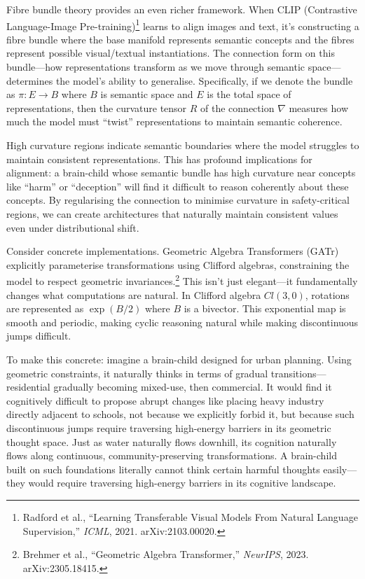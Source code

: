 \documentclass[acmsmall,screen]{acmart}
\begin{document}
Fibre bundle theory provides an even richer framework. When CLIP (Contrastive Language-Image Pre-training)\footnote{Radford et al., ``Learning Transferable Visual Models From Natural Language Supervision,'' \textit{ICML}, 2021. arXiv:2103.00020.} learns to align images and text, it's constructing a fibre bundle where the base manifold represents semantic concepts and the fibres represent possible visual/textual instantiations. The connection form on this bundle---how representations transform as we move through semantic space---determines the model's ability to generalise. Specifically, if we denote the bundle as $\pi: E \rightarrow B$ where $B$ is semantic space and $E$ is the total space of representations, then the curvature tensor $R$ of the connection $\nabla$ measures how much the model must ``twist'' representations to maintain semantic coherence.

High curvature regions indicate semantic boundaries where the model struggles to maintain consistent representations.
This has profound implications for alignment: a brain-child whose semantic bundle has high curvature near concepts like ``harm'' or ``deception'' will find it difficult to reason coherently about these concepts.
By regularising the connection to minimise curvature in safety-critical regions, we can create architectures that naturally maintain consistent values even under distributional shift.

Consider concrete implementations. Geometric Algebra Transformers (GATr) explicitly parameterise transformations using Clifford algebras, constraining the model to respect geometric invariances.\footnote{Brehmer et al., ``Geometric Algebra Transformer,'' \textit{NeurIPS}, 2023. arXiv:2305.18415.} This isn't just elegant---it fundamentally changes what computations are natural. In Clifford algebra $Cl(3,0)$, rotations are represented as $\exp(B/2)$ where $B$ is a bivector. This exponential map is smooth and periodic, making cyclic reasoning natural while making discontinuous jumps difficult. 

To make this concrete: imagine a brain-child designed for urban planning.
Using geometric constraints, it naturally thinks in terms of gradual transitions---residential gradually becoming mixed-use, then commercial.
It would find it cognitively difficult to propose abrupt changes like placing heavy industry directly adjacent to schools, not because we explicitly forbid it, but because such discontinuous jumps require traversing high-energy barriers in its geometric thought space.
Just as water naturally flows downhill, its cognition naturally flows along continuous, community-preserving transformations.
A brain-child built on such foundations literally cannot think certain harmful thoughts easily---they would require traversing high-energy barriers in its cognitive landscape.
\end{document}
